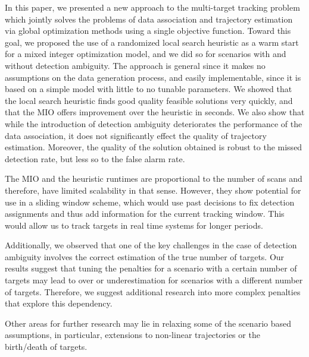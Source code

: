 In this paper, we presented a new approach to the multi-target tracking problem which jointly solves the problems of data association and trajectory estimation via global optimization methods using a single objective function. Toward this goal, we proposed the use of a randomized local search heuristic as a warm start for a mixed integer optimization model, and we did so for scenarios with and without detection ambiguity. The approach is general since it makes no assumptions on the data generation process, and easily implementable, since it is based on a simple model with little to no tunable parameters. We showed that the local search heuristic finds good quality feasible solutions very quickly, and that the MIO offers improvement over the heuristic in seconds. We also show that while the introduction of detection ambiguity deteriorates the performance of the data association, it does not significantly effect the quality of trajectory estimation. Moreover, the quality of the solution obtained is robust to the missed detection rate, but less so to the false alarm rate.

The MIO and the heuristic runtimes are proportional to the number of scans and therefore, have limited scalability in that sense. However, they show potential for use in a sliding window scheme, which would use past decisions to fix detection assignments and thus add information for the current tracking window. This would allow us to track targets in real time systems for longer periods. 

Additionally, we observed that one of the key challenges in the case of detection ambiguity involves the correct estimation of the true number of targets. Our results suggest that tuning the penalties for a scenario with a certain number of targets may lead to over or underestimation for scenarios with a different number of targets. Therefore, we suggest additional research into more complex penalties that explore this dependency. 

Other areas for further research may lie in relaxing some of the scenario based assumptions, in particular, extensions to non-linear trajectories or the birth/death of targets. 